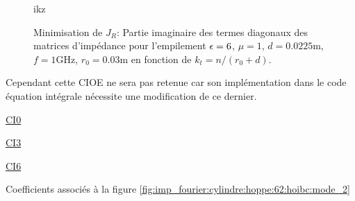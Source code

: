   \begin{figure}[!hbt]
    \centering
    
    \caption[CIOE sur empilement de Hoppe & Rahmat-Samii p.~62]{ikz}
    \caption[CIOE sur empilement de Hoppe & Rahmat-Samii p.~62]{Minimisation de \(J_R\): Partie imaginaire des termes diagonaux des matrices d'impédance pour l'empilement \(\epsilon = 6\), \(\mu = 1\), \(d=0.0225\text{m}\), \(f=1\text{GHz}\), \(r_0=0.03\text{m}\) en fonction de \(k_t = n / (r_0+d)\).}
    \label{fig:imp_fourier:cylindre:hoppe:62:hoibc:mode_1}
  \end{figure}

  Cependant cette CIOE ne sera pas retenue car son implémentation dans le code équation intégrale nécessite une modification de ce dernier.

  \begin{table}[!hbt]
    \centering
    \begin{minipage}[t]{0.49\textwidth}
      \vspace{0pt}
      \centering
      \begin{coefftable}{\hyperlink{ci0}{CI0}}
        
      \end{coefftable}
      \begin{coefftable}{\hyperlink{ci3}{CI3}}
        
      \end{coefftable}
    \end{minipage}
    \begin{minipage}[t]{0.49\textwidth}
      \vspace{0pt}
      \centering
      \begin{coefftable}{\hyperlink{ci6}{CI6}}
        
      \end{coefftable}
    \end{minipage}
    \caption{Coefficients associés à la figure \ref{fig:imp_fourier:cylindre:hoppe:62:hoibc:mode_2}}
    \label{tab:imp_fourier:cylindre:hoppe:62:hoibc:mode_2}
  \end{table}


